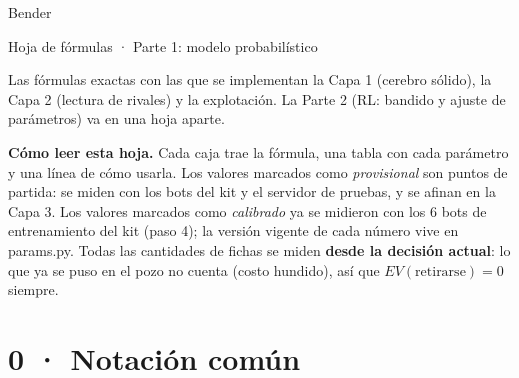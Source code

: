 \documentclass[10.5pt,a4paper]{article}
\newcommand{\code}[1]{{\ttfamily\small #1}}
\let\oldsection\section
\renewcommand{\section}{\needspace{16\baselineskip}\oldsection}
\begin{document}
{\headfont\color{felt}\Huge Bender\par}
\vspace{2pt}
{\headfont\Large Hoja de fórmulas · Parte 1: modelo probabilístico\par}
\vspace{4pt}
{\color{muted}Las fórmulas exactas con las que se implementan la Capa 1 (cerebro sólido), la Capa 2 (lectura de rivales) y la explotación. La Parte 2 (RL: bandido y ajuste de parámetros) va en una hoja aparte.\par}
\vspace{6pt}

\begin{notebox}\small
\textbf{Cómo leer esta hoja.} Cada caja trae la fórmula, una tabla con cada parámetro y una línea de cómo usarla. Los valores marcados como \emph{provisional} son puntos de partida: se miden con los bots del kit y el servidor de pruebas, y se afinan en la Capa 3. Los valores marcados como \emph{calibrado} ya se midieron con los 6 bots de entrenamiento del kit (paso 4); la versión vigente de cada número vive en \code{params.py}. Todas las cantidades de fichas se miden \textbf{desde la decisión actual}: lo que ya se puso en el pozo no cuenta (costo hundido), así que $EV(\text{retirarse}) = 0$ siempre.
\end{notebox}

\section*{0 · Notación común}
\end{document}
